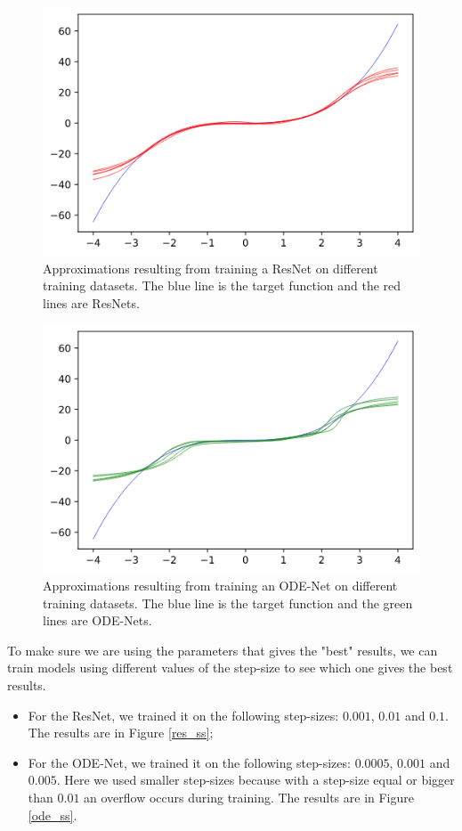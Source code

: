 \documentclass[10pt,a4paper]{article}
\theoremstyle{definition}
\theoremstyle{plain}
\begin{document}
\begin{figure}[!h]
\center
\includegraphics[scale=0.6]{resnet_random.png}
\caption{Approximations resulting from training a ResNet on different training datasets. The blue line is the target function and the red lines are ResNets.}
\label{res_r}
\end{figure}

\begin{figure}[!h]
\center
\includegraphics[scale=0.6]{odenet_random.png}
\caption{Approximations resulting from training an ODE-Net on different training datasets. The blue line is the target function and the green lines are ODE-Nets.}
\label{ode_r}
\end{figure}

To make sure we are using the parameters that gives the "best" results, we can train models using different values of the step-size to see which one gives the best results. 
\begin{itemize}
\item For the ResNet, we trained it on the following step-sizes: $0.001$, $0.01$ and $0.1$. The results are in Figure \ref{res_ss};
\item For the ODE-Net, we trained it on the following step-sizes: $0.0005$, $0.001$ and $0.005$. Here we used smaller step-sizes because with a step-size equal or bigger than $0.01$ an overflow occurs during training. The results are in Figure \ref{ode_ss}.
\end{itemize}
\end{document}
